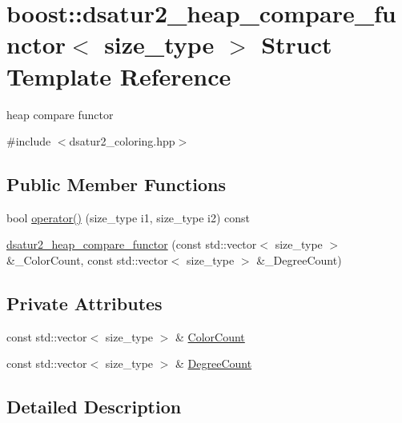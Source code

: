 \hypertarget{structboost_1_1dsatur2__heap__compare__functor}{}\section{boost\+:\+:dsatur2\+\_\+heap\+\_\+compare\+\_\+functor$<$ size\+\_\+type $>$ Struct Template Reference}
\label{structboost_1_1dsatur2__heap__compare__functor}


heap compare functor  




{\ttfamily \#include $<$dsatur2\+\_\+coloring.\+hpp$>$}

\subsection*{Public Member Functions}
\begin{DoxyCompactItemize}
\item 
bool \hyperlink{structboost_1_1dsatur2__heap__compare__functor_acecfc25425e13e3ab5fe04aeb906e59f}{operator()} (size\+\_\+type i1, size\+\_\+type i2) const
\item 
\hyperlink{structboost_1_1dsatur2__heap__compare__functor_a95f2c0af2d6ad317d7d3c50310e35a33}{dsatur2\+\_\+heap\+\_\+compare\+\_\+functor} (const std\+::vector$<$ size\+\_\+type $>$ \&\+\_\+\+Color\+Count, const std\+::vector$<$ size\+\_\+type $>$ \&\+\_\+\+Degree\+Count)
\end{DoxyCompactItemize}
\subsection*{Private Attributes}
\begin{DoxyCompactItemize}
\item 
const std\+::vector$<$ size\+\_\+type $>$ \& \hyperlink{structboost_1_1dsatur2__heap__compare__functor_a34f5528166c896b4121a8f9ac52c378a}{Color\+Count}
\item 
const std\+::vector$<$ size\+\_\+type $>$ \& \hyperlink{structboost_1_1dsatur2__heap__compare__functor_a647602dc2dfe4b88698bdd678ce34882}{Degree\+Count}
\end{DoxyCompactItemize}


\subsection{Detailed Description}
